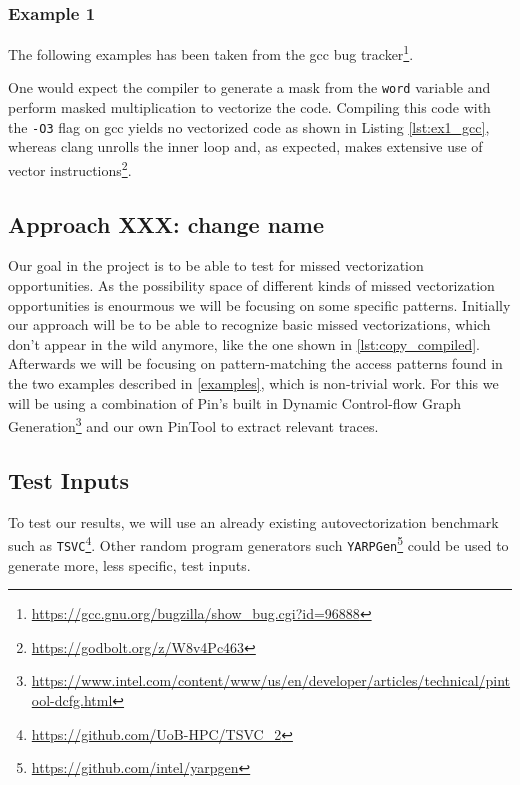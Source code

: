 \documentclass[acmsmall,review, nonacm]{acmart}
\begin{document}
\subsubsection{Example 1}
The following examples has been taken from the gcc bug tracker\footnote{\url{https://gcc.gnu.org/bugzilla/show_bug.cgi?id=96888}}.

One would expect the compiler to generate a mask from the \texttt{word} variable 
and perform masked multiplication to vectorize the code.
Compiling this code with the \texttt{-O3} flag on gcc yields no vectorized code 
as shown in Listing \ref{lst:ex1_gcc}, whereas clang unrolls the inner loop and, 
as expected, makes extensive use of vector instructions\footnote{\url{https://godbolt.org/z/W8v4Pc463}}.




\subsection{Approach XXX: change name}
Our goal in the project is to be able to test for missed vectorization 
opportunities. 
As the possibility space of different kinds of missed vectorization 
opportunities is enourmous we will be focusing on some specific patterns.
Initially our approach will be to be able to recognize basic missed 
vectorizations, which don't appear in the wild anymore, like the one shown in 
\ref{lst:copy_compiled}.
Afterwards we will be focusing on pattern-matching the access patterns found in 
the two examples described in \ref{examples}, which is non-trivial work.
For this we will be using a combination of Pin's built in Dynamic Control-flow 
Graph Generation\footnote{\url{https://www.intel.com/content/www/us/en/developer/articles/technical/pintool-dcfg.html}} 
and our own PinTool to extract relevant traces.


\subsection{Test Inputs}
To test our results, we will use an already existing autovectorization benchmark such as \texttt{TSVC}\footnote{\url{https://github.com/UoB-HPC/TSVC\_2}}.
Other random program generators such \texttt{YARPGen}\footnote{\url{https://github.com/intel/yarpgen}} could be used to generate more, less specific, test inputs.
\end{document}
